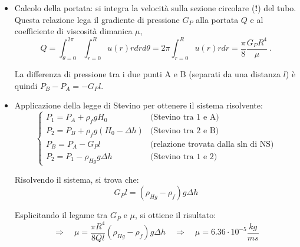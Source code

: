 \begin{itemize}
\item Calcolo della portata: si integra la velocità sulla sezione circolare (\textbf{!}) del tubo. Questa relazione lega il gradiente di pressione $G_P$ alla portata $Q$ e al coefficiente di viscosità dimanica $\mu$,
\begin{equation}
  Q = \int_{\theta=0}^{2\pi} \int_{r=0}^{R} u(r) r dr d\theta = 
  2\pi \int_{r=0}^{R} u(r) r dr =
  \dfrac{\pi}{8}\dfrac{G_P R^4}{\mu} \ .
\end{equation}

La differenza di pressione tra i due punti A e B (separati da una distanza $l$) è quindi $P_B - P_A = -G_P l$.

\item Applicazione della legge di Stevino per ottenere il sistema risolvente:
\begin{equation}
\begin{cases}
  P_1 = P_A + \rho_f g H_0 & \text{(Stevino tra 1 e A)} \\
  P_2 = P_B + \rho_f g (H_0-\Delta h) & \text{(Stevino tra 2 e B)} \\
  P_B = P_A - G_P l & \text{(relazione trovata dalla sln di NS)} \\
  P_2 = P_1 - \rho_{Hg} g \Delta h & \text{(Stevino tra 1 e 2)}
\end{cases}
\end{equation}

Risolvendo il sistema, si trova che:
\begin{equation}
  G_P l = (\rho_{Hg} - \rho_f) g \Delta h
\end{equation}

Esplicitando il legame tra $G_P$ e $\mu$, si ottiene il risultato:
\begin{equation}
  \Rightarrow \quad \mu = \dfrac{\pi R^4}{8 Q l} (\rho_{Hg} - \rho_f) g \Delta h \quad \Rightarrow \quad \mu = 6.36 \cdot 10^{-5} \dfrac{kg}{m s}
\end{equation}


\end{itemize}
